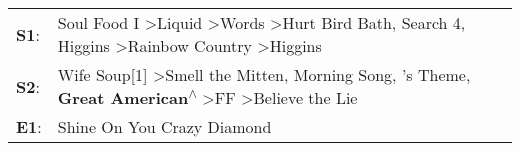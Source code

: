 \begin{supertabular}{p{0.03\textwidth}p{0.92\textwidth}}
 \textbf{S1}:  &  Soul Food I\textsuperscript{} \textgreater \enspace Liquid\textsuperscript{} \textgreater \enspace Words\textsuperscript{} \textgreater \enspace Hurt Bird Bath\textsuperscript{}, \enspace Search 4\textsuperscript{}, \enspace Higgins\textsuperscript{} \textgreater \enspace Rainbow Country\textsuperscript{} \textgreater \enspace Higgins\textsuperscript{}  \enspace  \\
 \textbf{S2}:  &                              Wife Soup[1]\textsuperscript{} \textgreater \enspace Smell the Mitten\textsuperscript{}, \enspace Morning Song\textsuperscript{}, 's Theme\textsuperscript{}, \enspace \textbf{Great American\textsuperscript{$\wedge$}} \textgreater \enspace FF\textsuperscript{} \textgreater \enspace Believe the Lie\textsuperscript{}  \enspace  \\
 \textbf{E1}:  &                                                                                                                                                                                                                                                                                                                        Shine On You Crazy Diamond\textsuperscript{}  \enspace  \\
\end{supertabular}
